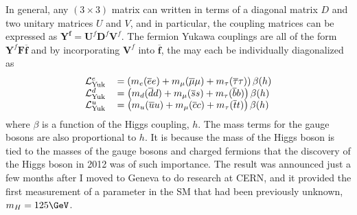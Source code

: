  In general, any $(3\times 3)$ matrix can written
  in terms of a diagonal matrix $D$ and two 
  unitary matrices $U$ and $V$, and in particular,
  the coupling matrices can be expressed as 
  $\mathbf{Y^f} = \mathbf{U}^f\mathbf{D}^f\mathbf{V}^f$.
 The fermion Yukawa couplings are all of the form
  $\mathbf{Y}^f \mathbf{F} \mathbf{\overline{f}}$ and by incorporating
  $\mathbf{V}^f$ into $\mathbf{\overline{f}}$, 
  the may each be individually diagonalized as
\begin{equation}
\begin{tabular}{rl}
$\mathcal{L}^e_{\mathrm{Yuk}}$ &
 $ = \left( m_e (\overline{e}e) + m_\mu(\overline{\mu}\mu) + m_\tau(\overline{\tau}\tau ) \right) \beta(h)$
\\
$\mathcal{L}^d_{\mathrm{Yuk}}$ &
 $ = \left( m_d (\overline{d}d) + m_\mu(\overline{s}s) + m_\tau(\overline{b}b ) \right) \beta(h)$
\\
$\mathcal{L}^u_{\mathrm{Yuk}}$ &
 $ = \left( m_u (\overline{u}u)+ m_\mu(\overline{c}c) + m_\tau(\overline{t}t ) \right) \beta(h)$
\\
\end{tabular}
\end{equation} 
  where $\beta$ is a function of the Higgs coupling, $h$. 
 The mass terms for the gauge bosons are also
  proportional to $h$.
 It is because the mass of the Higgs boson is tied
  to the masses of the gauge bosons and 
  charged fermions that the discovery of
  the Higgs boson in 2012
  was of such importance.
 The result was announced just a few months
  after I moved to Geneva
  to do research at CERN,
  and it provided the first measurement of
  a parameter in the SM that had been previously unknown,
  $m_H=125\GeV$.

